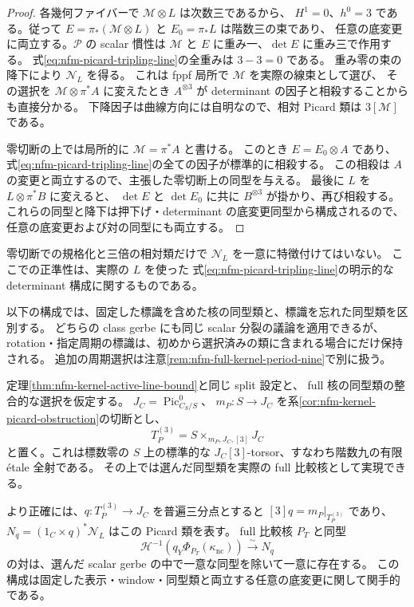 \begin{proof}
各幾何ファイバーで $\mathscr M\otimes L$ は次数三であるから、
$H^1=0$、$h^0=3$ である。従って
$E=\pi_*(\mathscr M\otimes L)$ と $E_0=\pi_*L$ は階数三の束であり、
任意の底変更に両立する。$\mathscr P$ の scalar 慣性は
$\mathscr M$ と $E$ に重み一、$\det E$ に重み三で作用する。
式\eqref{eq:nfm-picard-tripling-line}の全重みは $3-3=0$ である。
重み零の束の降下\cite[Proposition~4.10]{NFMBerghSchnurer}により
$\mathscr N_L$ を得る。
これは fppf 局所で $\mathscr M$ を実際の線束として選び、
その選択を $\mathscr M\otimes\pi^*A$ に変えたとき
$A^{\otimes3}$ が determinant の因子と相殺することからも直接分かる。
下降因子は曲線方向には自明なので、相対 Picard 類は $3[\mathscr M]$ である。

零切断の上では局所的に $\mathscr M=\pi^*A$ と書ける。
このとき $E=E_0\otimes A$ であり、
式\eqref{eq:nfm-picard-tripling-line}の全ての因子が標準的に相殺する。
この相殺は $A$ の変更と両立するので、主張した零切断上の同型を与える。
最後に $L$ を $L\otimes\pi^*B$ に変えると、
$\det E$ と $\det E_0$ に共に $B^{\otimes3}$ が掛かり、再び相殺する。
これらの同型と降下は押下げ・determinant の底変更同型から構成されるので、
任意の底変更および対の同型にも両立する。
\end{proof}

零切断での規格化と三倍の相対類だけで $\mathscr N_L$ を一意に特徴付けてはいない。
ここでの正準性は、実際の $L$ を使った
式\eqref{eq:nfm-picard-tripling-line}の明示的な determinant 構成に関するものである。

以下の構成では、固定した標識を含めた核の同型類と、標識を忘れた同型類を区別する。
どちらの class gerbe にも同じ scalar 分裂の議論を適用できるが、
rotation・指定周期の標識は、初めから選択済みの類に含まれる場合にだけ保持される。
追加の周期選択は注意\ref{rem:nfm-full-kernel-period-nine}で別に扱う。

\begin{theorem}
\label{thm:nfm-kernel-tripling-cover}
定理\ref{thm:nfm-kernel-active-line-bound}と同じ split 設定と、
full 核の同型類の整合的な選択を仮定する。
$J_C=\operatorname{Pic}^0_{C_S/S}$、
$m_P:S\to J_C$ を系\ref{cor:nfm-kernel-picard-obstruction}の切断とし、
\begin{equation}
\label{eq:nfm-kernel-tripling-cover}
 T_P^{(3)}=S\mathbin{\times}_{m_P,J_C,[3]}J_C
\end{equation}
と置く。これは標数零の $S$ 上の標準的な
$J_C[3]$-torsor、すなわち階数九の有限 \'etale 全射である。
その上では選んだ同型類を実際の full 比較核として実現できる。

より正確には、$q:T_P^{(3)}\to J_C$ を普遍三分点とすると
$[3]q=m_P|_{T_P^{(3)}}$ であり、
$N_q=(1_C\times q)^*\mathscr N_L$ はこの Picard 類を表す。
full 比較核 $P_T$ と同型
\[
 \mathcal H^{-1}\!\left(q_Y\Phi_{P_T}(\kappa_{\mathrm{nc}})\right)
       \xrightarrow{\sim}N_q
\]
の対は、選んだ scalar gerbe の中で一意な同型を除いて一意に存在する。
この構成は固定した表示・window・同型類と両立する任意の底変更に関して関手的である。
\end{theorem}

